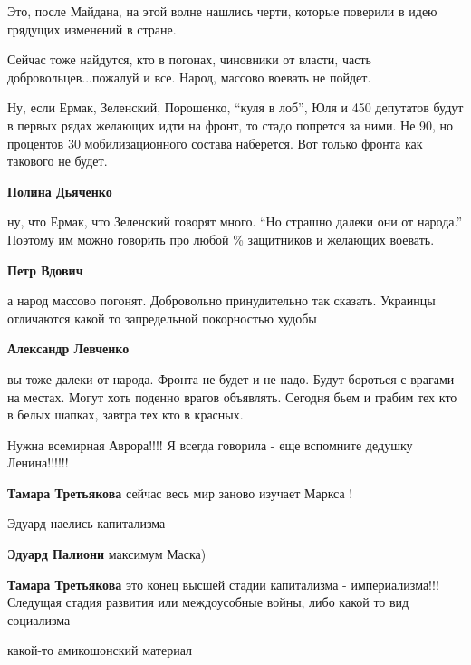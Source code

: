 \begin{itemize}
\begin{itemize}
Это, после Майдана, на этой волне нашлись черти, которые поверили в идею
грядущих изменений в стране.

Сейчас тоже найдутся, кто в погонах, чиновники от власти, часть
добровольцев...пожалуй и все. Народ, массово воевать не пойдет.


Ну, если Ермак, Зеленский, Порошенко, \enquote{куля в лоб}, Юля и 450 депутатов будут в
первых рядах желающих идти на фронт, то стадо попрется за ними. Не 90, но
процентов 30 мобилизационного состава наберется. Вот только фронта как такового
не будет.

\textbf{Полина Дьяченко} 

ну, что Ермак, что Зеленский говорят много. \enquote{Но страшно далеки они от народа.}
Поэтому им можно говорить про любой \% защитников и желающих воевать.

\textbf{Петр Вдович} 

а народ массово погонят. Добровольно принудительно так сказать. Украинцы
отличаются какой то запредельной покорностью худобы

\textbf{Александр Левченко} 

вы тоже далеки от народа. Фронта не будет и не надо. Будут бороться с врагами
на местах. Могут хоть поденно врагов объявлять. Сегодня бьем и грабим тех кто в
белых шапках, завтра тех кто в красных.

\end{itemize} %

Нужна всемирная Аврора!!!! Я всегда говорила - еще вспомните дедушку Ленина!!!!!!

\begin{itemize} %
\textbf{Тамара Третьякова} сейчас весь мир заново изучает Маркса !

Эдуард наелись капитализма

\textbf{Эдуард Палиони} максимум Маска)

\textbf{Тамара Третьякова} это конец высшей стадии капитализма - империализма!!! Следущая стадия развития или междоусобные войны, либо какой то вид социализма
\end{itemize} %

какой-то амикошонский материал



\end{itemize}
